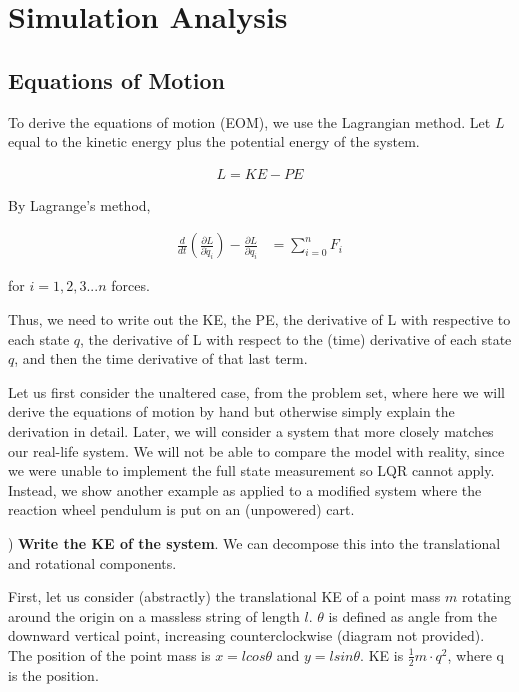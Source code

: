 \documentclass[conference]{IEEEtran}
\begin{document}
\section{Simulation Analysis}

\subsection{Equations of Motion}

To derive the equations of motion (EOM), we use the Lagrangian method. Let $L$
equal to the kinetic energy plus the potential energy of the system.


\begin{align}
    L = KE - PE
\end{align}

By Lagrange's method,

\begin{align}
    \frac{d}{dt} (\frac{\partial{L}}{\partial \dot{q}_i}) -
    \frac{\partial{L}}{\partial q_i}  &= \sum_{i=0}^{n} F_i
\end{align}

for $i = 1,2,3 ... n $ forces.

Thus, we need to write out the KE, the PE, the derivative of L with respective
to each state $q$, the derivative of L with respect to the (time) derivative of
each state $q$, and then the time derivative of that last term.

Let us first consider the unaltered case, from the problem set, where here we
will derive the equations of motion by hand but otherwise simply explain the
derivation in detail. Later, we will consider a system that more closely matches
our real-life system. We will not be able to compare the model with reality,
since we were unable to implement the full state measurement so LQR cannot
apply. Instead, we show another example as applied to a modified system where
the reaction wheel pendulum is put on an (unpowered) cart.


) \textbf{Write the KE of the system}. We can decompose this into the translational and
rotational components.

First, let us consider (abstractly) the translational KE of a point mass $m$ rotating
around the origin on a massless string of length $l$. $\theta$ is defined as
angle from the downward vertical point, increasing counterclockwise  (diagram not provided).
The position of the point mass is $x = l cos \theta$ and $y = l sin \theta$.
KE is $\frac{1}{2} m \cdot q^2$, where q is the position.
\end{document}
